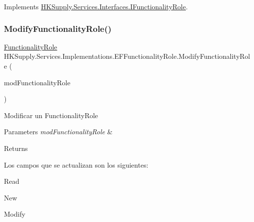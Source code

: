 Implements \mbox{\hyperlink{interface_h_k_supply_1_1_services_1_1_interfaces_1_1_i_functionality_role}{H\+K\+Supply.\+Services.\+Interfaces.\+I\+Functionality\+Role}}.

\mbox{\label{class_h_k_supply_1_1_services_1_1_implementations_1_1_e_f_functionality_role_a69bbb7f8593ea4e0e70ce96625cf80e4}} 
\subsubsection{\texorpdfstring{Modify\+Functionality\+Role()}{ModifyFunctionalityRole()}}
{\footnotesize\ttfamily \mbox{\hyperlink{class_h_k_supply_1_1_models_1_1_functionality_role}{Functionality\+Role}} H\+K\+Supply.\+Services.\+Implementations.\+E\+F\+Functionality\+Role.\+Modify\+Functionality\+Role (\begin{DoxyParamCaption}\item[{\mbox{\hyperlink{class_h_k_supply_1_1_models_1_1_functionality_role}{Functionality\+Role}}}]{mod\+Functionality\+Role }\end{DoxyParamCaption})}



Modificar un Functionality\+Role 


\begin{DoxyParams}{Parameters}
{\em mod\+Functionality\+Role} & \\
\hline
\end{DoxyParams}
\begin{DoxyReturn}{Returns}

\end{DoxyReturn}


Los campos que se actualizan son los siguientes\+:
\begin{DoxyItemize}
\item Read
\item New
\item Modify 
\end{DoxyItemize}

